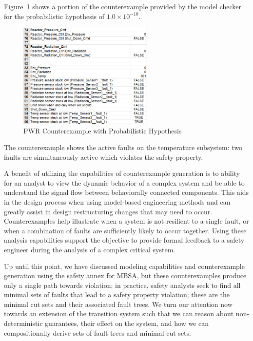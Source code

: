 Figure~\ref{fig:probPWRVerifCoex} shows a portion of the counterexample provided by the model checker for the probabilistic hypothesis of $1.0 \times 10^{-10}$. 

\begin{figure}[h!]
		\includegraphics[width=0.6\textwidth]{images/probPWRVerifCoex.png}
	\caption{PWR Counterexample with Probabilistic Hypothesis}
	\label{fig:probPWRVerifCoex}
\end{figure}

The counterexample shows the active faults on the temperature subsystem: two faults are simultaneously active which violates the safety property. 

A benefit of utilizing the capabilities of counterexample generation is to ability for an analyst to view the dynamic behavior of a complex system and be able to understand the signal flow between behaviorally connected components. This aids in the design process when using model-based engineering methods and can greatly assist in design restructuring changes that may need to occur. Counterexamples help illustrate when a system is not resilient to a single fault, or when a combination of faults are sufficiently likely to occur together. Using these analysis capabilities support the objective to provide formal feedback to a safety engineer during the analysis of a complex critical system.

Up until this point, we have discussed modeling capabilities and counterexample generation using the safety annex for MBSA, but these counterexamples produce only a single path towards violation; in practice, safety analysts seek to find all minimal sets of faults that lead to a safety property violation; these are the minimal cut sets and their associated fault trees. We turn our attention now towards an extension of the transition system such that we can reason about non-deterministic guarantees, their effect on the system, and how we can compositionally derive sets of fault trees and minimal cut sets. 